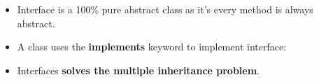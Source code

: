 \setlength{\columnsep}{3pt}
\begin{flushleft}
	
	\begin{itemize}
		\item Interface is a 100\% pure abstract class as it's every method is always abstract.
		\item A class uses the \textbf{implements} keyword to implement interface:
		\item Interfaces \textbf{solves the multiple inheritance problem}.
				
	\end{itemize}	
	
\end{flushleft}


